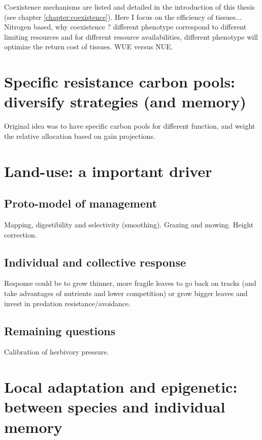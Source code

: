 Coexistence mechanisms are listed and detailed in the introduction of this thesis (see chapter \ref{chapter:coexistence}). Here I focus on the efficiency of tissues... Nitrogen based, why coexistence ? different phenotype correspond to different limiting resources and for different resource availabilities, different phenotype will optimize the return cost of tissues. WUE versus NUE.

\chapter{Specific resistance carbon pools: diversify strategies (and memory)}

Original idea was to have specific carbon pools for different function, and weight the relative allocation based on gain projections.

\chapter{Land-use: a important driver}

\section{Proto-model of management}

Mapping, digestibility and selectivity (smoothing). Grazing and mowing. Height correction.

\section{Individual and collective response}
Response could be to grow thinner, more fragile leaves to go back on tracks (and take advantages of nutrients and lower competition) or grow bigger leaves and invest in predation resistance/avoidance.

\section{Remaining questions}

Calibration of herbivory pressure.


\chapter{Local adaptation and epigenetic: between species and individual memory}





